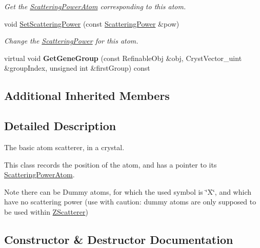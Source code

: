 \begin{DoxyCompactItemize}
\begin{DoxyCompactList}\small\item\em Get the \mbox{\hyperlink{class_obj_cryst_1_1_scattering_power_atom}{Scattering\+Power\+Atom}} corresponding to this atom. \end{DoxyCompactList}\item 
\mbox{\label{class_obj_cryst_1_1_atom_a111b96d82473e6386d18fec662d65c91}} 
void \mbox{\hyperlink{class_obj_cryst_1_1_atom_a111b96d82473e6386d18fec662d65c91}{Set\+Scattering\+Power}} (const \mbox{\hyperlink{class_obj_cryst_1_1_scattering_power}{Scattering\+Power}} \&pow)
\begin{DoxyCompactList}\small\item\em Change the \mbox{\hyperlink{class_obj_cryst_1_1_scattering_power}{Scattering\+Power}} for this atom. \end{DoxyCompactList}\item 
\mbox{\label{class_obj_cryst_1_1_atom_ab9578662bc4cbef83789a358de609d37}} 
virtual void {\bfseries Get\+Gene\+Group} (const Refinable\+Obj \&obj, Cryst\+Vector\+\_\+uint \&group\+Index, unsigned int \&first\+Group) const
\end{DoxyCompactItemize}
\subsection*{Additional Inherited Members}


\subsection{Detailed Description}
The basic atom scatterer, in a crystal.

This class records the position of the atom, and has a pointer to its \mbox{\hyperlink{class_obj_cryst_1_1_scattering_power_atom}{Scattering\+Power\+Atom}}.

\begin{DoxyNote}{Note}
there can be \textquotesingle{}Dummy\textquotesingle{} atoms, for which the used symbol is \char`\"{}\+X\char`\"{}, and which have no scattering power (use with caution\+: dummy atoms are only supposed to be used within \mbox{\hyperlink{class_obj_cryst_1_1_z_scatterer}{Z\+Scatterer}}) 
\end{DoxyNote}


\subsection{Constructor \& Destructor Documentation}
\mbox{\label{class_obj_cryst_1_1_atom_afa78c541a05f1210e9913c4591752042}} 
